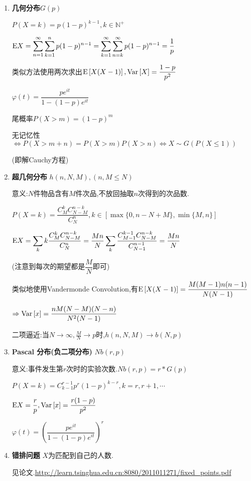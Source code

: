 \begin{enumerate}
    \item \textbf{几何分布}$ G(p)$

      $ P(X=k) = p(1-p)^{k-1}, k \in \mathbb{N^+}$

      $ \Ex{X} = \sum_{n=1}^{\infty}\sum_{k=1}^{n}{p(1-p)^{n-1}}=
      \sum_{k=1}^{\infty}\sum_{n=k}^{\infty}{p(1-p)^{n-1}}= \dfrac{1}{p}$

      类似方法使用两次求出$ \text{E}\left[X(X-1)\right],\text{Var}\left[X\right] = \dfrac{1-p}{p^2}$

      $ \varphi(t) = \dfrac{pe^{it}}{1-(1-p)e^{it}}$

      尾概率$ P(X>m) = (1-p)^m$

      无记忆性 $\Leftrightarrow P(X>m+n) = P(X>m)P(X>n)\Leftrightarrow X\sim G(P(X\le 1)) $

          (即解Cauchy方程)

        \item \textbf{超几何分布} $ h(n,N,M),(n, M\le N)$

          意义:$ N$件物品含有$ M$件次品,不放回抽取$ n$次得到的次品数.

          $ P(X=k) = \dfrac{C_M^kC_{N-M}^{n-k}}{C_N^n}, k \in [\max\{0, n-N + M\}, \min\{M,n\}]$

          $ \Ex{X} = \sum_{k}{k\dfrac{C_M^kC_{N-M}^{n-k}}{C_N^n}}  = \dfrac{Mn}{N}\sum_{k}{\dfrac{C_{M-1}^{k-1}C_{N-M}^{n-k}}{C_{N-1}^{n-1}}} = \dfrac{Mn}{N}$

          (注意到每次的期望都是$ \dfrac{M}{N}$即可)

          类似地使用Vandermonde Convolution,有$ 	\text{E}\left[X(X-1)\right] = \dfrac{M(M-1)n(n-1)}{N(N-1)}$

          $\Rightarrow \text{Var}\left[x\right]  = \dfrac{nM(N-M)(N-n)}{N^2(N-1)} $

        二项逼近:当$N\to\infty, \frac{M}{N}\to p $时,$ h(n,N,M)\to b(N,p)$

      \item \textbf{Pascal 分布(负二项分布)} $ Nb(r,p)$

        意义:事件发生第$ r$次时的实验次数.$ Nb(r, p) = r * G(p) $

        $ P(X = k) = C_{k-1}^{r-1}p^r(1-p)^{k-r}, k = r,r+1,\cdots$

        $ \text{E}X = \dfrac{r}{p}, \text{Var}\left[x\right] = \dfrac{r(1-p)}{p^2}$

        $ \varphi(t) = (\dfrac{pe^{it}}{1-(1-p)e^{it}})^r$

      \item \textbf{错排问题} $ X $为匹配到自己的人数.

        见论文.\url{http://learn.tsinghua.edu.cn:8080/2011011271/fixed_points.pdf}

    \end{enumerate}
